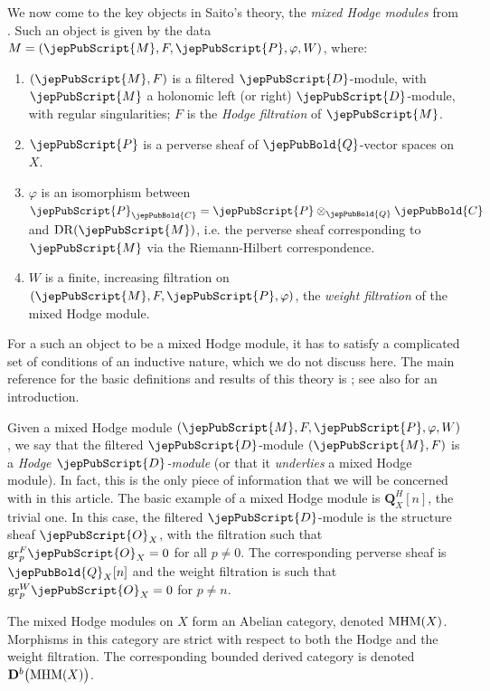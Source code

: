 We now come to the key objects in Saito's theory, the \emph{mixed Hodge modules} from \cite{Saito-MHM}. Such an object is given by the data 
$M=(\jepPubScript{M},F,\jepPubScript{P} ,\varphi, W)$, where:
\begin{enumerate}
\item[(i)] $(\jepPubScript{M},F)$ is a filtered $\jepPubScript{D}$-module, with $\jepPubScript{M}$ a holonomic left (or right) $\jepPubScript{D}$-module, with regular singularities; 
$F$ is the \emph{Hodge filtration} of $\jepPubScript{M}$.
\item[(ii)] $\jepPubScript{P}$ is a perverse sheaf of $\jepPubBold{Q}$-vector spaces on $X$.
\item[(iii)] $\varphi$ is an isomorphism between $\jepPubScript{P}_{\jepPubBold{C}} = \jepPubScript{P} \otimes_{\jepPubBold{Q}} \jepPubBold{C}$ and ${\rm DR}(\jepPubScript{M})$, i.e. 
the perverse sheaf corresponding to $\jepPubScript{M}$ via the Riemann-Hilbert correspondence.
\item[(iv)] $W$ is a finite, increasing filtration on $(\jepPubScript{M},F, \jepPubScript{P},\varphi)$, the \emph{weight filtration} of the mixed Hodge module.
\end{enumerate}
For a such an object to be a mixed Hodge module, it has to satisfy 
a complicated set of conditions of an inductive nature, which we do not discuss here.
The main reference for the basic definitions and results of this theory is \cite{Saito-MHM}; see also 
\cite{Saito-YPG} for an introduction. 


Given a mixed Hodge module $(\jepPubScript{M},F,\jepPubScript{P},\varphi, W)$, we say that the filtered $\jepPubScript{D}$-module $(\jepPubScript{M},F)$ is a \emph{Hodge $\jepPubScript{D}$-module}
(or that it
\emph{underlies} a mixed Hodge module). In fact, this is the only piece of information that we will be concerned with in this article. 
The basic example of a mixed Hodge module is ${\mathbf Q}_X^H[n]$, the trivial one. In this case, the filtered $\jepPubScript{D}$-module is the structure sheaf $\jepPubScript{O}_X$, 
with the filtration such that ${\rm gr}_p^F\jepPubScript{O}_X=0$ for all $p\neq 0$. The corresponding perverse sheaf is $\jepPubBold{Q}_X [n]$ and the weight filtration is such that 
${\rm gr}_p^W\jepPubScript{O}_X=0$ for $p\neq n$. 

The mixed Hodge modules on $X$ form an Abelian category, denoted ${\rm MHM}(X)$. Morphisms in this category are strict with respect to both the Hodge
and the weight filtration. The corresponding bounded derived category is denoted ${\bf D}^b\big({\rm MHM}(X)\big)$. 

